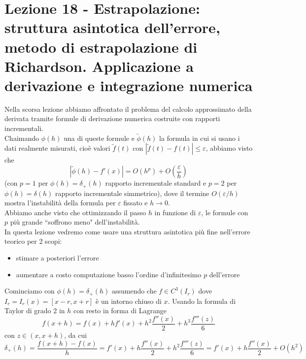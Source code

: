 \documentclass[12pt,a4paper]{article}
\begin{document}
\section[Lezione 18 - Estrapolazione]{Lezione 18 - Estrapolazione: struttura asintotica dell'errore, metodo di estrapolazione di Richardson. Applicazione a derivazione e integrazione numerica}
Nella scorsa lezione abbiamo affrontato il problema del calcolo approssimato della derivata tramite formule di derivazione numerica costruite con rapporti incrementali.\\Chaimando $\phi(h)$ una di queste
formule e $\tilde{\phi}(h)$ la formula in cui si usano i dati realmente misurati, cioè valori $\tilde{f}(t)$ con $|\tilde{f}(t)-f(t)|\leq\varepsilon$, abbiamo visto che
\begin{equation*}
    \left|\tilde{\phi}(h)-f'(x)\right|=O(h^p)+O\left(\frac{\varepsilon}{h}\right)
\end{equation*}
(con $p=1$ per $\phi(h)=\delta_+(h)$ rapporto incrementale standard e $p=2$ per $\phi(h)=\delta(h)$ rapporto incrementale simmetrico), dove il termine $O(\varepsilon/h)$ mostra l'instabilità della formula per $\varepsilon$ fissato e $h\rightarrow0$.\\
Abbiamo anche visto che ottimizzando il passo $h$ in funzione di $\varepsilon$, le formule con $p$ più grande ``soffrono meno" dell'instabilità. \\In questa lezione vedremo come usare una struttura asintotica più fine nell'errore teorico per 2 scopi:
\begin{itemize}
    \item stimare a posteriori l'errore
    \item aumentare a costo computazione basso l'ordine d'infinitesimo $p$ dell'errore
\end{itemize}
Cominciamo con $\phi(h)=\delta_+(h)$ assumendo che $f\in C^3(I_r)$ dove $I_r=I_r(x)=[x-r,x+r]$ è un intorno chiuso di $x$. Usando la formula di Taylor di grado 2 in $h$ con resto in forma di Lagrange
\begin{equation*}
    f(x+h)=f(x)+hf'(x)+h^2\frac{f''(x)}{2}+h^3\frac{f'''(z)}{6}
\end{equation*}
con $z\in (x,x+h)$, da cui 
\begin{equation*}
    \delta_+(h)=\frac{f(x+h)-f(x)}{h}=f'(x)+h\frac{f''(x)}{2}+h^2\frac{f'''(z)}{6}=f'(x)+h\frac{f''(x)}{2}+O(h^2)
\end{equation*}
\end{document}

